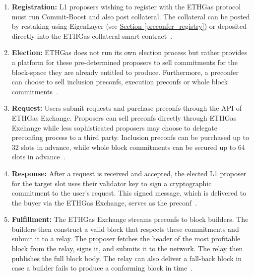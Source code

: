 \documentclass[a4paper]{article}
\theoremstyle{boldstyle}
\begin{document}
        
        \begin{enumerate}
            \item \textbf{Registration:}
            L1 proposers wishing to register with the ETHGas protocol must run Commit-Boost and also post collateral. The collateral can be posted by restaking using EigenLayer (see \hyperref[preconfer_registry]{Section \ref{preconfer_registry}}) or deposited directly into the ETHGas collateral smart contract~\cite{W:ETHGasDocs-Validators}.
            
            \item \textbf{Election:} 
            ETHGas does not run its own election process but rather provides a platform for these pre-determined proposers to sell commitments for the block-space they are already entitled to produce. Furthermore, a preconfer can choose to sell inclusion preconfs, execution preconfs or whole block commitments~\cite{W:IntroducingETHGasandRealtimeProposerCommitmentstotheLidoCommunity,W:ETHGasDocs-Overview}.
            
            \item \textbf{Request:}
            Users submit requests and purchase preconfs through the API of ETHGas Exchange.  Proposers can sell preconfs directly through ETHGas Exchange while less sophisticated proposers may choose to delegate preconfing process to a third party. Inclusion preconfs can be purchased up to 32 slots in advance, while whole block commitments can be secured up to 64 slots in advance~\cite{W:ETHGasDocs-CommitmentBuyers,W:IntroducingETHGasandRealtimeProposerCommitmentstotheLidoCommunity}.
                        
            \item \textbf{Response:}
            After a request is received and accepted, the elected L1 proposer for the target slot uses their validator key to sign a cryptographic commitment to the user's request. This signed message, which is delivered to the buyer via the ETHGas Exchange, serves as the preconf~\cite{W:IntroducingETHGasandRealtimeProposerCommitmentstotheLidoCommunity,W:ETHGasDocs-TheETHGasArchitecture}.
            
            \item \textbf{Fulfillment:}
            The ETHGas Exchange streams preconfs to block builders. The builders then construct a valid block that respects these commitments and submit it to a relay. The proposer fetches the header of the most profitable block from the relay, signs it, and submits it to the network. The relay then publishes the full block body. The relay can also deliver a fall-back block in case a builder fails to produce a conforming block in time~\cite{W:ETHGasDocs-BuildersSequencers,W:ETHGasDocs-Relays}.
            

\end{enumerate}
\end{document}

